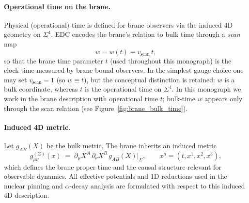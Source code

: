 \documentclass[11pt,a4paper]{article}
\begin{document}
\paragraph{Operational time on the brane.}
Physical (operational) time is defined for brane observers via the induced 4D geometry on $\Sigma^4$.
EDC encodes the brane's relation to bulk time through a \emph{scan} map
\begin{equation}
w = w(t) \equiv v_{\mathrm{scan}}\, t,
\label{eq:scan_time}
\end{equation}
so that the brane time parameter $t$ (used throughout this monograph) is the clock-time measured by brane-bound observers.
In the simplest gauge choice one may set $v_{\mathrm{scan}}=1$ (so $w\equiv t$), but the conceptual distinction is retained: $w$ is a bulk coordinate, whereas $t$ is the operational time on $\Sigma^4$.
In this monograph we work in the brane description with operational time $t$; bulk-time $w$ appears only through the scan relation (see Figure~\ref{fig:brane_bulk_time}).

\paragraph{Induced 4D metric.}
Let $g_{AB}(X)$ be the bulk metric. The brane inherits an induced metric
\begin{equation}
g^{(\Sigma)}_{\mu\nu}(x) \;=\; \partial_{\mu}X^{A}\,\partial_{\nu}X^{B}\,g_{AB}(X)\big|_{\Sigma},
\qquad x^{\mu}=(t,x^{1},x^{2},x^{3}),
\label{eq:induced_metric}
\end{equation}
which defines the brane proper time and the causal structure relevant for observable dynamics.
All effective potentials and 1D reductions used in the nuclear pinning and $\alpha$-decay analysis are formulated with respect to this induced 4D description.
\end{document}

